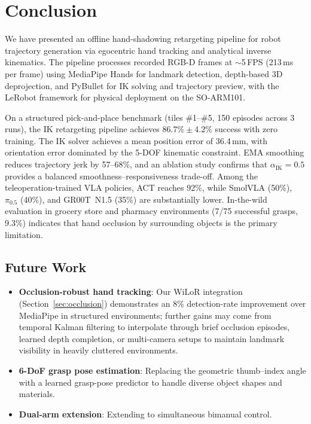 \documentclass{ieeeaccess}
\begin{document}
\section{Conclusion}

We have presented an offline hand-shadowing retargeting pipeline for
robot trajectory generation via egocentric hand tracking and analytical
inverse kinematics. The pipeline processes recorded RGB-D frames at
${\sim}$5\,FPS (213\,ms per frame) using MediaPipe Hands for landmark
detection, depth-based 3D deprojection, and PyBullet for IK solving
and trajectory preview, with the LeRobot framework for physical
deployment on the SO-ARM101.

On a structured pick-and-place benchmark (tiles \#1--\#5,
150 episodes across 3 runs), the IK retargeting pipeline achieves
$86.7\% \pm 4.2\%$ success with zero training. The IK solver achieves
a mean position error of 36.4\,mm, with orientation error dominated by the
5-DOF kinematic constraint. EMA smoothing reduces trajectory jerk by
57--68\%, and an ablation study confirms that $\alpha_{\text{IK}} = 0.5$ provides
a balanced smoothness--responsiveness trade-off.
Among the teleoperation-trained VLA policies, ACT reaches 92\%, while
SmolVLA (50\%), $\pi_{0.5}$ (40\%), and GR00T~N1.5 (35\%) are
substantially lower. In-the-wild evaluation in grocery store and
pharmacy environments (7/75 successful grasps, 9.3\%) indicates that
hand occlusion by surrounding objects is the primary limitation.

\subsection{Future Work}
\begin{itemize}
  \item \textbf{Occlusion-robust hand tracking}: Our WiLoR integration
        (Section~\ref{sec:occlusion}) demonstrates an 8\% detection-rate
        improvement over MediaPipe in structured environments; further
        gains may come from temporal Kalman filtering to interpolate
        through brief occlusion episodes, learned depth completion,
        or multi-camera setups to maintain landmark visibility in
        heavily cluttered environments.
  \item \textbf{6-DoF grasp pose estimation}: Replacing the
        geometric thumb--index angle with a learned grasp-pose
        predictor to handle diverse object shapes and materials.
  \item \textbf{Dual-arm extension}: Extending to simultaneous
        bimanual control.
\end{itemize}
\end{document}
